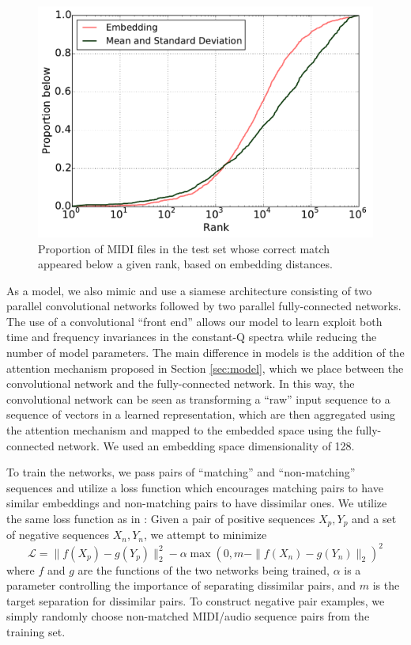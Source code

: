 \documentclass{article}
\begin{document}
\begin{figure}[t]
  \centering
  \includegraphics[width=\columnwidth]{ranks.pdf}
  \caption{Proportion of MIDI files in the test set whose correct match appeared below a given rank, based on embedding distances.}
  \label{fig:ranks}
\end{figure}

As a model, we also mimic \cite{raffel2015large} and use a siamese architecture consisting of two parallel convolutional networks followed by two parallel fully-connected networks.
The use of a convolutional ``front end'' allows our model to learn exploit both time and frequency invariances in the constant-Q spectra while reducing the number of model parameters.
The main difference in models is the addition of the attention mechanism proposed in Section \ref{sec:model}, which we place between the convolutional network and the fully-connected network.
In this way, the convolutional network can be seen as transforming a ``raw'' input sequence to a sequence of vectors in a learned representation, which are then aggregated using the attention mechanism and mapped to the embedded space using the fully-connected network.
We used an embedding space dimensionality of 128.

To train the networks, we pass pairs of ``matching'' and ``non-matching'' sequences and utilize a loss function which encourages matching pairs to have similar embeddings and non-matching pairs to have dissimilar ones.
We utilize the same loss function as in \cite{raffel2015large}: Given a pair of positive sequences $X_p, Y_p$ and a set of negative sequences $X_n, Y_n$, we attempt to minimize
$$
\mathcal{L} = \|f(X_p) - g(Y_p)\|_2^2 - \alpha \max(0, m - \|f(X_n) - g(Y_n)\|_2)^2
$$
where $f$ and $g$ are the functions of the two networks being trained, $\alpha$ is a parameter controlling the importance of separating dissimilar pairs, and $m$ is the target separation for dissimilar pairs.
To construct negative pair examples, we simply randomly choose non-matched MIDI/audio sequence pairs from the training set.
\end{document}
